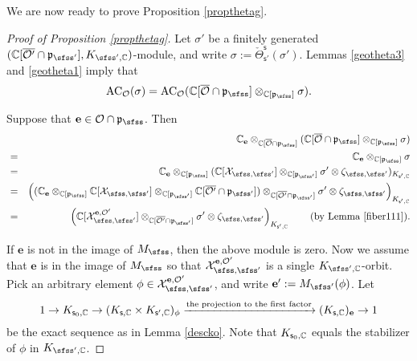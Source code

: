 \documentclass[12pt,a4paper]{amsart}
\newcommand{\CO}{{\mathcal {O}}}
\newcommand{\CX}{{\mathcal {X}}}
\newcommand{\p}{\mathfrak p}
\numberwithin{equation}{section}
\theoremstyle{remark}
\begin{document}
We are now ready to prove Proposition \ref{propthetag}.

\begin{proof}[Proof of Proposition \ref{propthetag}]
Let  $\sigma'$ be a finitely generated  $(\C[\overline{\CO'}\cap \p_{\sfss'}], K_{\sfss', \C})$-module, and write  $\sigma:=\check \Theta_{\mathsf s'}^{\mathsf s}(\sigma')$.
 Lemmas \ref{geotheta3} and \ref{geotheta1} imply that
\[
  \mathrm{AC}_{\CO}(\sigma)=\mathrm{AC}_{\CO}(\C[\overline \CO\cap \p_{\sfss}]\otimes_{\C[\p_{\sfss}]} \sigma).
\]

Suppose that $\mathbf e\in \CO\cap \p_\sfss$. Then
\begin{eqnarray*}
  && \C_\mathbf e \otimes_{\C[\overline \CO\cap \p_{\sfss}]} (\C[\overline \CO\cap \p_{\sfss}]\otimes_{\C[\p_{\sfss}]} \sigma)\\
  &=&  \C_\mathbf e \otimes_{\C[\p_{\sfss}]} \sigma\\
  &=&  \C_\mathbf e \otimes_{\C[\p_{\sfss}]} (\C[\CX_{\sfss, \sfss'}]\otimes_{\C[\p_{\sfss'}]} \sigma'\otimes \zeta_{\sfss, \sfss'})_{K_{\mathsf s', \C}} \\
   &=&\left( (\C_\mathbf e \otimes_{\C[\p_{\sfss}]} \C[\CX_{\sfss, \sfss'}]\otimes_{\C[\p_{\sfss'}]} \C[\overline{\CO'}\cap \p_{\sfss'}]) \otimes_{\C[\overline{\CO'}\cap \p_{\sfss'}]}\sigma'\otimes \zeta_{\sfss, \sfss'}\right)_{K_{\mathsf s', \C}} \\
      &=&\left( \C[\CX_{\sfss, \sfss'}^{\mathbf e, \CO'}] \otimes_{\C[\overline{\CO'}\cap \p_{\sfss'}]}\sigma'\otimes \zeta_{\sfss, \sfss'}\right)_{K_{\mathsf s', \C}} \qquad (\textrm{by Lemma \ref{fiber111}}).
\end{eqnarray*}

If $\mathbf e$ is not in the image of $M_\sfss$, then the above module is zero. Now we assume that $\mathbf e$ is in the image of $M_\sfss$ so that $\CX_{\sfss, \sfss'}^{\mathbf e, \CO'}$ is a single $K_{\sfss',\C}$-orbit. Pick an arbitrary element $\phi\in \CX_{\sfss, \sfss'}^{\mathbf e, \CO'}$, and write $\mathbf e':=M_{\sfss'}(\phi)$. Let
\[
  1\rightarrow K_{\mathsf s_0,\mathbb{C}}\rightarrow (K_{\mathsf s,\mathbb{C}}\times K_{\mathsf s', \mathbb{C}})_\phi\xrightarrow{\textrm{the projection to the first factor}} (K_{\mathsf s,\mathbb{C}})_{\mathbf e}\rightarrow 1
\]
be the exact  sequence as in Lemma \ref{descko}. Note that $ K_{\mathsf s_0,\mathbb{C}}$ equals the stabilizer of $\phi$ in $K_{\sfss', \C}$.



\end{proof}
\end{document}
